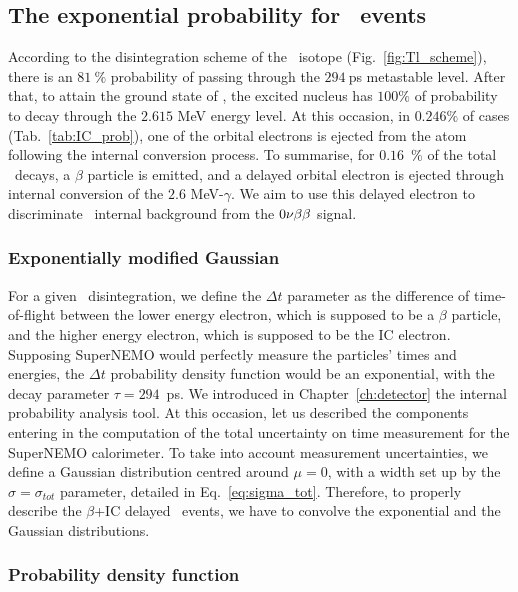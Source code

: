 \subsection{The exponential probability for \Tl\ events}

According to the disintegration scheme of the \Tl\ isotope (Fig.~\ref{fig:Tl_scheme}), there is an $81~\%$ probability of passing through the $294~$ps metastable level.
After that, to attain the ground state of \Pb, the excited nucleus has $100\%$ of probability to decay through the $2.615$ MeV energy level.
At this occasion, in $0.246\%$ of cases (Tab.~\ref{tab:IC_prob}), one of the orbital electrons is ejected from the atom following the internal conversion process.
To summarise, for $0.16$~\% of the total \Tl\ decays, a $\beta$ particle is emitted, and a delayed orbital electron is ejected through internal conversion of the $2.6$ MeV-$\gamma$.
We aim to use this delayed electron to discriminate \Tl\ internal background from the $0\nu\beta\beta$ signal.

\subsubsection{Exponentially modified Gaussian}

For a given \Tl\ disintegration, we define the $\Delta t$ parameter as the difference of time-of-flight between the lower energy electron, which is supposed to be a $\beta$ particle, and the higher energy electron, which is supposed to be the IC electron.
Supposing SuperNEMO would perfectly measure the particles' times and energies, the $\Delta t$ probability density function would be an exponential, with the decay parameter $\tau=294$~ps.
We introduced in Chapter~\ref{ch:detector} the internal probability analysis tool.
At this occasion, let us described the components entering in the computation of the total uncertainty on time measurement for the SuperNEMO calorimeter.
To take into account measurement uncertainties, we define a Gaussian distribution centred around $\mu=0$, with a width set up by the $\sigma=\sigma_{tot}$ parameter, detailed in Eq.~\eqref{eq:sigma_tot}.
Therefore, to properly describe the $\beta$+IC delayed \Tl\ events, we have to convolve the exponential and the Gaussian distributions.

\subsubsection{Probability density function}

